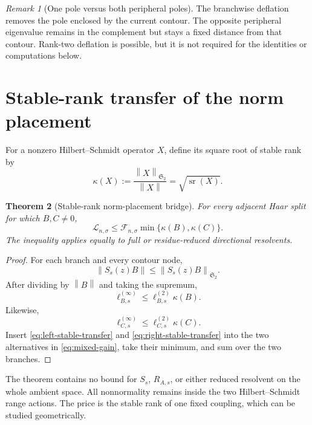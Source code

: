\documentclass[11pt]{article}
\newtheorem{theorem}{Theorem}[section]
\theoremstyle{definition}
\theoremstyle{remark}
\newtheorem{remark}[theorem]{Remark}
\newcommand{\cF}{\mathcal F}
\newcommand{\cL}{\mathcal L}
\newcommand{\HS}{\mathfrak S_2}
\newcommand{\norm}[1]{\left\lVert #1\right\rVert}
\newcommand{\sr}{\operatorname{sr}}
\begin{document}
\begin{remark}[One pole versus both peripheral poles]
The branchwise deflation removes the pole enclosed by the current contour.
The opposite peripheral eigenvalue remains in the complement but stays a
fixed distance from that contour.  Rank-two deflation is possible, but it is
not required for the identities or computations below.
\end{remark}

\section{Stable-rank transfer of the norm placement}
\label{sec:stable-rank}

For a nonzero Hilbert--Schmidt operator \(X\), define its square root of
stable rank by
\begin{equation}
 \kappa(X):=\frac{\norm X_{\HS}}{\norm X}
 =\sqrt{\sr(X)}.
 \label{eq:sqrt-stable-rank}
\end{equation}

\begin{theorem}[Stable-rank norm-placement bridge]
\label{thm:stable-rank-bridge}
For every adjacent Haar split for which \(B,C\ne0\),
\begin{equation}
 \boxed{
 \cL_{n,\sigma}
 \le
 \cF_{n,\sigma}\min\{\kappa(B),\kappa(C)\}.}
 \label{eq:stable-rank-bridge}
\end{equation}
The inequality applies equally to full or residue-reduced directional
resolvents.
\end{theorem}

\begin{proof}
For each branch and every contour node,
\[
 \norm{S_s(z)B}
 \le\norm{S_s(z)B}_{\HS}.
\]
After dividing by \(\norm B\) and taking the supremum,
\begin{equation}
 \ell_{B,s}^{(\infty)}
 \le\ell_{B,s}^{(2)}\kappa(B).
 \label{eq:left-stable-transfer}
\end{equation}
Likewise,
\begin{equation}
 \ell_{C,s}^{(\infty)}
 \le\ell_{C,s}^{(2)}\kappa(C).
 \label{eq:right-stable-transfer}
\end{equation}
Insert \eqref{eq:left-stable-transfer} and
\eqref{eq:right-stable-transfer} into the two alternatives in
\eqref{eq:mixed-gain}, take their minimum, and sum over the two branches.
\end{proof}

The theorem contains no bound for \(S_s\), \(R_{A,s}\), or either reduced
resolvent on the whole ambient space.  All nonnormality remains inside the
two Hilbert--Schmidt range actions.  The price is the stable rank of one
fixed coupling, which can be studied geometrically.
\end{document}
